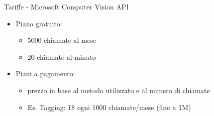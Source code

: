 %
\begin{frame}[t]{Tariffe - Microsoft Computer Vision API}
	\begin{itemize}
		\item Piano gratuito:
		\begin{itemize}
			\item 5000 chiamate al mese
			\item 20 chiamate al minuto
		\end{itemize}
		\item Piani a pagamento:
		\begin{itemize}
			\item prezzo in base al metodo utilizzato e al numero di chiamate
			\item Es. Tagging: 1\$ ogni 1000 chiamate/mese (fino a 1M)
		\end{itemize}
	\end{itemize}
\end{frame}
%
